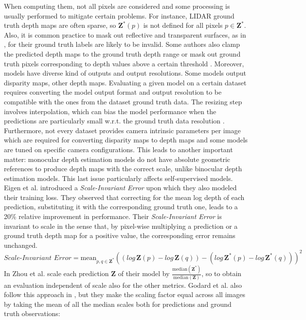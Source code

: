 When computing them, not all pixels are considered and some processing is usually performed to mitigate certain problems.
For instance, LIDAR ground truth depth maps are often sparse, so $\mathbf{Z}^{*}(p)$ is not defined for all pixels $p \in \mathbf{Z}^{*}$.
Also, it is common practice to mask out reflective and transparent surfaces, as in \cite{Eigen}, for their ground truth labels are likely to be invalid.
Some authors also clamp the predicted depth maps \cite{Garg} to the ground truth depth range or mask out ground truth pixels corresponding to depth values above a certain threshold \cite{evalStudy}.
Moreover, models have diverse kind of outputs and output resolutions.
Some models output disparity maps, other depth maps.
Evaluating a given model on a certain dataset requires converting the model output format and output resolution to be compatible with the ones from the dataset ground truth data.
The resizing step involves interpolation, which can bias the model performance when the predictions are particularly small w.r.t. the ground truth data resolution \cite{evalStudy}.
Furthermore, not every dataset provides camera intrinsic parameters per image which are required for converting disparity maps to depth maps and some models are tuned on specific camera configurations.
This leads to another important matter: monocular depth estimation models do not have absolute geometric references to produce depth maps with the correct scale, unlike binocular depth estimation models.
This last issue particularly affects self-supervised models.
Eigen et al. \cite{Eigen} introduced a \textit{Scale-Invariant Error} upon which they also modeled their training loss.
They observed that correcting for the mean log depth of each prediction, substituting it with the corresponding ground truth one, leads to a 20\% relative improvement in performance.
Their \textit{Scale-Invariant Error} is invariant to scale in the sense that, by pixel-wise multiplying a prediction or a ground truth depth map for a positive value, the corresponding error remains unchanged.
\[
	\textit{Scale-Invariant Error} =
		\text{mean}_{p, q \in \mathbf{Z}^{*}}
		(
			( log \, \mathbf{Z}(p) - log \, \mathbf{Z}(q)) -
			( log \, \mathbf{Z}^{*}(p) - log \, \mathbf{Z}^{*}(q))
		)^{2}
\]
In \cite{SfMLearner} Zhou et al. scale each prediction $\mathbf{Z}$ of their model by $\frac{\text{median}(\mathbf{Z}^{*})}{\text{median}(\mathbf{Z})}$, so to obtain an evaluation independent of scale also for the other metrics.
Godard et al. also follow this approach in \cite{MonoDepth2}, but they make the scaling factor equal across all images by taking the mean of all the median scales both for predictions and ground truth observations:
